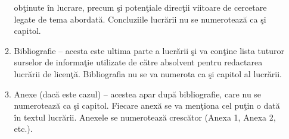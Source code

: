 \documentclass{article}
\begin{document}
\begin{enumerate}
\begin{enumerate}
	obţinute \^{i}n lucrare, precum şi potenţiale direcţii viitoare de cercetare
	legate de tema abordat\u{a}. Concluziile lucr\u{a}rii nu se numeroteaz\u{a} ca şi
	capitol.
      \item Bibliografie – acesta este ultima parte a lucr\u{a}rii şi va conţine lista tuturor
	surselor de informaţie utilizate de c\u{a}tre absolvent pentru redactarea
	lucr\u{a}rii de licenţ\u{a}. Bibliografia nu se va numerota ca şi capitol al lucr\u{a}rii.
      \item Anexe (dac\u{a} este cazul) – acestea apar dup\u{a} bibliografie, care nu se
	numeroteaz\u{a} ca şi capitol. Fiecare anex\u{a} se va menţiona cel puţin o dat\u{a}
	\^{i}n textul lucr\u{a}rii. Anexele se numeroteaz\u{a} cresc\u{a}tor (Anexa 1, Anexa 2,
	etc.). 
   \end{enumerate}
 \end{enumerate}
\end{document}
